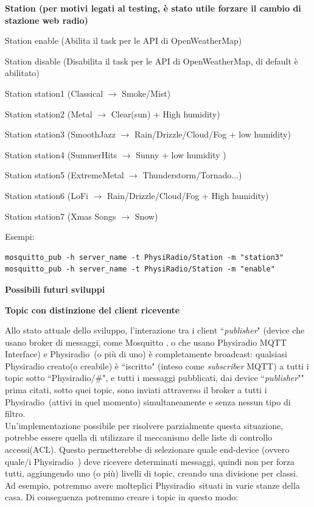 \documentclass[12pt,a4paper]{report}
\newcommand{\physiradio}{Physiradio} %
\begin{document}
\textbf{Station (per motivi legati al testing, è stato utile forzare il cambio di stazione web radio)}

\begin{compactitem}
	\item
	Station enable (Abilita il task per le API di OpenWeatherMap)
	\item
	Station disable (Disabilita il task per le API di OpenWeatherMap, di default è abilitato)
	\item
	Station station1 (Classical $\rightarrow$ Smoke/Mist)
	\item
	Station station2 (Metal $\rightarrow$ Clear(sun) + High humidity)
	\item
	Station station3 (SmoothJazz $\rightarrow$ Rain/Drizzle/Cloud/Fog + low humidity)
	\item
	Station station4 (SummerHits $\rightarrow$ Sunny + low humidity )
	\item
	Station station5 (ExtremeMetal $\rightarrow$ Thunderstorm/Tornado...)
	\item
	Station station6 (LoFi $\rightarrow$ Rain/Drizzle/Cloud/Fog + High humidity)
	\item
	Station station7 (Xmas Songs $\rightarrow$ Snow)
\end{compactitem}

Esempi:

\begin{lstlisting}[style=customBash]
mosquitto_pub -h server_name -t PhysiRadio/Station -m "station3"
mosquitto_pub -h server_name -t PhysiRadio/Station -m "enable"
\end{lstlisting}

{\large\textbf{Possibili futuri sviluppi}}

\textbf{Topic con distinzione del client ricevente}


Allo stato attuale dello sviluppo, l'interazione tra i client ``\textit{publisher}" (device che usano broker di messaggi, come Mosquitto \cite{mosquitto}, o che usano Physiradio MQTT Interface) e \physiradio\ (o più di uno) è completamente broadcast: qualsiasi Physiradio creato(o creabile) è ``iscritto" (inteso come \textit{subscriber} MQTT) a tutti i topic sotto ``Physiradio/\#", e tutti i messaggi pubblicati, dai device ``\textit{publisher}"" prima citati, sotto quei topic, sono inviati attraverso il broker a tutti i \physiradio\ (attivi in quel momento) simultaneamente e senza nessun tipo di filtro. \\
Un'implementazione possibile per risolvere parzialmente questa situazione, potrebbe essere quella di utilizzare il meccanismo delle liste di controllo accessi(ACL). Questo permetterebbe di selezionare quale end-device (ovvero quale/i \physiradio\ ) deve ricevere determinati messaggi, quindi non per forza tutti, aggiungendo uno (o più) livelli di topic, creando una divisione per classi. \\
Ad esempio, potremmo avere molteplici \physiradio\ situati in varie stanze della casa. Di conseguenza potremmo creare i topic in questo modo:
\end{document}
